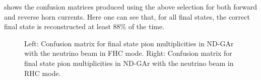  shows the confusion matrices produced using the above selection for both forward and reverse horn currents. 
Here one can see that, for all final states, the correct final state is reconstructed at least 88\% of the time.

\begin{figure}[h]
	\begin{minipage}[t]{.5\linewidth}
		\begin{adjustbox}{max totalsize=\linewidth, center}
			
		\end{adjustbox}
	\end{minipage}
	\hfill
	\begin{minipage}[t]{.5\linewidth}
		\begin{adjustbox}{max totalsize=\linewidth, center}
			
		\end{adjustbox}
	\end{minipage}
	\caption[Confusion matrices for final state pion multiplicities in ND-GAr]{Left: Confusion matrix for final state pion multiplicities in ND-GAr with the neutrino beam in FHC mode. Right: Confusion matrix for final state pion multiplicities in ND-GAr with the neutrino beam in RHC mode.}
	\label{fig:confusMatPi}
\end{figure}

%			
%			

